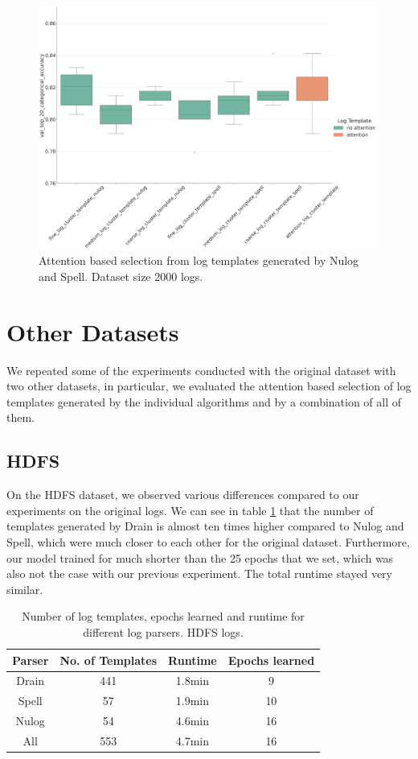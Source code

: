 \begin{figure}[H]
    \centering
    \includegraphics[keepaspectratio=true,scale=0.15]{figures/5_results/nulog+spell.png}
    \caption{Attention based selection from log templates generated by Nulog and Spell. Dataset size 2000 logs.}
    \label{fig:nulog_spell}
\end{figure}




\section{Other Datasets}
We repeated some of the experiments conducted with the original dataset with two other datasets, in particular, we evaluated the attention based selection of log templates generated by the individual algorithms and by a combination of all of them.

\subsection{HDFS}
On the HDFS dataset, we observed various differences compared to our experiments on the original logs. We can see in table \ref{tab:hdfs} that the number of templates generated by Drain is almost ten times higher compared to Nulog and Spell, which were much closer to each other for the original dataset. Furthermore, our model trained for much shorter than the 25 epochs that we set, which was also not the case with our previous experiment. The total runtime stayed very similar.  

\begin{table}[htbp]
  \centering
  \begin{tabular}{cccc}
    \hline
    \textbf{Parser} & \textbf{No. of Templates} & \textbf{Runtime} & \textbf{Epochs learned} \\
    \hline
    Drain & 441  & 1.8min & 9 \\
    Spell & 57   & 1.9min & 10 \\
    Nulog & 54  & 4.6min & 16 \\
    All & 553 & 4.7min & 16 \\
    \hline
  \end{tabular}
  \caption{Number of log templates, epochs learned and runtime for different log parsers. HDFS logs.}
  \label{tab:hdfs}
\end{table}

